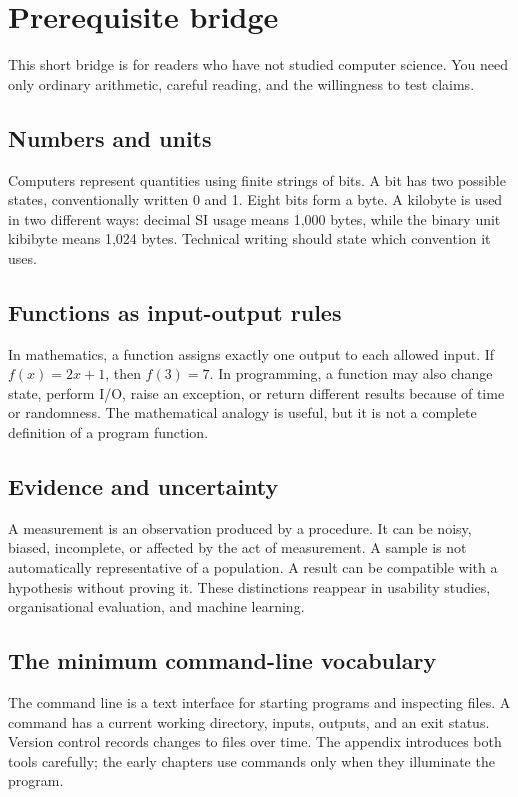 \chapter*{Prerequisite bridge}

This short bridge is for readers who have not studied computer science. You need only ordinary arithmetic, careful reading, and the willingness to test claims.

\section*{Numbers and units}
Computers represent quantities using finite strings of bits. A bit has two possible states, conventionally written 0 and 1. Eight bits form a byte. A kilobyte is used in two different ways: decimal SI usage means 1,000 bytes, while the binary unit kibibyte means 1,024 bytes. Technical writing should state which convention it uses.

\section*{Functions as input-output rules}
In mathematics, a function assigns exactly one output to each allowed input. If $f(x)=2x+1$, then $f(3)=7$. In programming, a function may also change state, perform I/O, raise an exception, or return different results because of time or randomness. The mathematical analogy is useful, but it is not a complete definition of a program function.

\section*{Evidence and uncertainty}
A measurement is an observation produced by a procedure. It can be noisy, biased, incomplete, or affected by the act of measurement. A sample is not automatically representative of a population. A result can be compatible with a hypothesis without proving it. These distinctions reappear in usability studies, organisational evaluation, and machine learning.

\section*{The minimum command-line vocabulary}
The command line is a text interface for starting programs and inspecting files. A command has a current working directory, inputs, outputs, and an exit status. Version control records changes to files over time. The appendix introduces both tools carefully; the early chapters use commands only when they illuminate the program.


